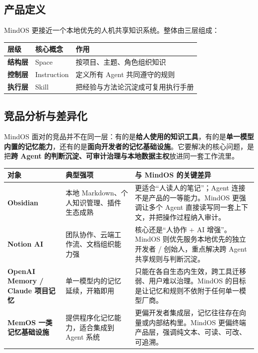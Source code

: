 \documentclass[11pt,a4paper]{ctexart}
\begin{document}
\subsection{产品定义}

MindOS 更接近一个本地优先的人机共享知识系统。整体由三层组成：

\begin{tabularx}{\textwidth}{@{}>{\bfseries}p{2.4cm}p{2.4cm}X@{}}
\toprule
层级 & 核心概念 & 作用 \\
\midrule
结构层 & Space & 按项目、主题、角色组织知识 \\
控制层 & Instruction & 定义所有 Agent 共同遵守的规则 \\
执行层 & Skill & 把经验与方法论沉淀成可复用执行手册 \\
\bottomrule
\end{tabularx}

\subsection{竞品分析与差异化}

MindOS 面对的竞品并不在同一层：有的是\textbf{给人使用的知识工具}，有的是\textbf{单一模型内置的记忆能力}，还有的是\textbf{面向开发者的记忆基础设施}。它要解决的核心问题，是把\textbf{跨 Agent 的判断沉淀、可审计治理与本地数据主权}放进同一套工作流里。

\begin{center}
\small
\begin{tabularx}{\textwidth}{@{}>{\raggedright\arraybackslash\bfseries}p{2.45cm}>{\raggedright\arraybackslash}p{2.75cm}X@{}}
\toprule
对象 & 典型强项 & 与 MindOS 的关键差异 \\
\midrule
Obsidian & 本地 Markdown、个人知识管理、插件生态成熟 & 更适合“人读人的笔记”；Agent 连接不是产品的一等能力。MindOS 更强调让多个 Agent 直接读写同一套上下文，并把操作过程纳入审计。 \\
Notion AI & 团队协作、云端工作流、文档组织能力强 & 核心还是“人协作 + AI 增强”。MindOS 则优先服务本地优先的独立开发者 / 创始人，重点解决跨 Agent 共享规则与判断沉淀。 \\
OpenAI Memory / Claude 项目记忆 & 单一模型内的记忆延续，开箱即用 & 只能在各自生态内生效，跨工具迁移弱、用户难以治理。MindOS 的目标是让记忆和规则不依附于任何单一模型厂商。 \\
MemOS 一类记忆基础设施 & 提供程序化记忆能力，适合集成到 Agent 系统 & 更偏开发者集成层，记忆往往存在向量或内部结构里。MindOS 更偏终端产品层，强调纯文本、可读、可改、可追溯。 \\
\bottomrule
\end{tabularx}
\end{center}
\end{document}
